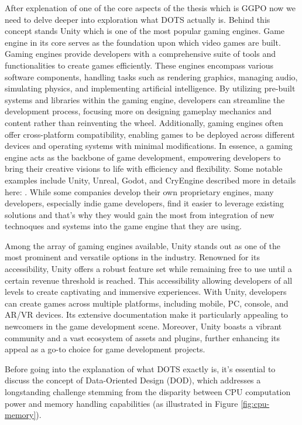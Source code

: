 After explenation of one of the core aspects of the thesis which is GGPO now we need to delve deeper into exploration what DOTS actually is. Behind this concept stands Unity which is one of the most popular gaming engines. Game engine in its core serves as the foundation upon which video games are built. Gaming engines provide developers with a comprehensive suite of tools and functionalities to create games efficiently. These engines encompass various software components, handling tasks such as rendering graphics, managing audio, simulating physics, and implementing artificial intelligence. By utilizing pre-built systems and libraries within the gaming engine, developers can streamline the development process, focusing more on designing gameplay mechanics and content rather than reinventing the wheel. Additionally, gaming engines often offer cross-platform compatibility, enabling games to be deployed across different devices and operating systems with minimal modifications. In essence, a gaming engine acts as the backbone of game development, empowering developers to bring their creative visions to life with efficiency and flexibility. Some notable examples include Unity, Unreal, Godot, and CryEngine described more in details here: \cite{Game_engines_comparison}. While some companies develop their own proprietary engines, many developers, especially indie game developers, find it easier to leverage existing solutions and that's why they would gain the most from integration of new technoques and systems into the game engine that they are using.\newline

Among the array of gaming engines available, Unity stands out as one of the most prominent and versatile options in the industry. Renowned for its accessibility, Unity offers a robust feature set while remaining free to use until a certain revenue threshold is reached. This accessibility allowing developers of all levels to create captivating and immersive experiences. With Unity, developers can create games across multiple platforms, including mobile, PC, console, and AR/VR devices. Its extensive documentation make it particularly appealing to newcomers in the game development scene. Moreover, Unity boasts a vibrant community and a vast ecosystem of assets and plugins, further enhancing its appeal as a go-to choice for game development projects.\newline

Before going into the explanation of what DOTS exactly is, it's essential to discuss the concept of Data-Oriented Design (DOD), which addresses a longstanding challenge stemming from the disparity between CPU computation power and memory handling capabilities (as illustrated in Figure \ref{fig:cpu-memory}).

